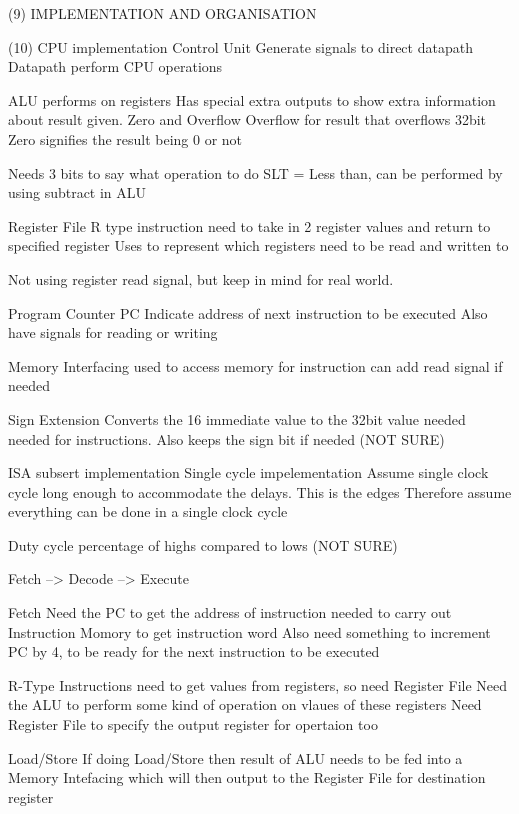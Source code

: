 \documentclass{article}
\begin{document}
	(9) IMPLEMENTATION AND ORGANISATION

	(10) CPU implementation
		Control Unit
			Generate signals to direct datapath
		Datapath
			perform CPU operations

		ALU performs on registers
			Has special extra outputs to show extra information about result given. Zero and Overflow
			Overflow for result that overflows 32bit
			Zero signifies the result being 0 or not

			Needs 3 bits to say what operation to do
			SLT = Less than, can be performed by using subtract in ALU


		Register File
			R type instruction need to take in 2 register values and return to specified register
			Uses to represent which registers need to be read and written to

			Not using register read signal, but keep in mind for real world.

		Program Counter PC
			Indicate address of next instruction to be executed
			Also have signals for reading or writing

		Memory Interfacing
			used to access memory for instruction
			can add read signal if needed

		Sign Extension
			Converts the 16 immediate value to the 32bit value needed needed for instructions. Also keeps the sign bit if needed (NOT SURE)

	ISA subsert implementation
		Single cycle impelementation
			Assume single clock cycle long enough to accommodate the delays. This is the edges
			Therefore assume everything can be done in a single clock cycle

			Duty cycle
				percentage of highs compared to lows (NOT SURE)

		Fetch --> Decode --> Execute

		Fetch
			Need the PC to get the address of instruction needed to carry out
			Instruction Momory to get instruction word
			Also need something to increment PC by 4, to be ready for the next instruction to be executed

		R-Type Instructions
			need to get values from registers, so need Register File
			Need the ALU to perform some kind of operation on vlaues of these registers 
			Need Register File to specify the output register for opertaion too

		Load/Store
			If doing Load/Store then result of ALU needs to be fed into a Memory Intefacing which will then output to the Register File for destination register
\end{document}
